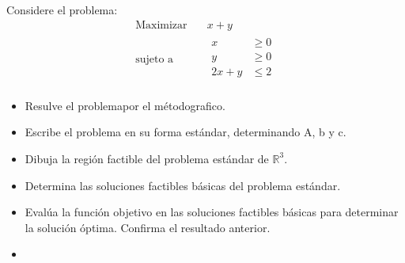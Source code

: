 \documentclass{article}
\begin{document}
Considere el problema:
\begin{equation*}
  \begin{aligned}
    \text{Maximizar} &\quad x+y \\
    \text{sujeto a} & \quad
    \begin{aligned}
      x & \geq 0\\
      y & \geq 0\\
      2x+y & \leq 2\\
    \end{aligned}
  \end{aligned}
\end{equation*}
\begin{itemize}
\item Resulve el problemapor el métodografico.
\item Escribe el problema en su forma estándar, determinando A, b y c.
\item Dibuja la región factible del problema estándar de $\mathbb{R}^{3}.$
\item Determina las soluciones factibles básicas del problema estándar.
\item Evalúa la función objetivo en las soluciones factibles básicas para determinar la solución óptima. Confirma el resultado anterior.
  \item 
\end{itemize}
\end{document}
